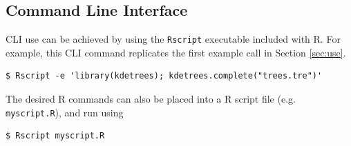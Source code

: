 \documentclass{article}
\begin{document}
\subsection{Command Line Interface}
\label{sec:CLI}

CLI use can be achieved by using the {\tt Rscript} executable included
with R. For example, this CLI command replicates the first example call in
Section \ref{sec:use}.
\begin{verbatim}
$ Rscript -e 'library(kdetrees); kdetrees.complete("trees.tre")'
\end{verbatim}
The desired R commands can also be placed into a R script file
(e.g. {\tt myscript.R}), and run using
\begin{verbatim}
$ Rscript myscript.R
\end{verbatim}



\end{document}
